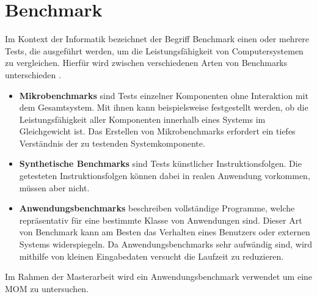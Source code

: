 \section{Benchmark}
Im Kontext der Informatik bezeichnet der Begriff Benchmark einen oder mehrere Tests, die ausgeführt werden, um die Leistungsfähigkeit von Computersystemen zu vergleichen. Hierfür wird zwischen verschiedenen Arten von Benchmarks unterschieden \cite{Lilja2004}. 
\begin{itemize}
\item \textbf{Mikrobenchmarks} sind Tests einzelner Komponenten ohne Interaktion mit dem Gesamtsystem. Mit ihnen kann beispielsweise festgestellt werden, ob die Leistungsfähigkeit aller Komponenten innerhalb eines Systems im Gleichgewicht ist. Das Erstellen von Mikrobenchmarks erfordert ein tiefes Verständnis der zu testenden Systemkomponente.

\item \textbf{Synthetische Benchmarks} sind Tests künstlicher Instruktionsfolgen. Die getesteten Instruktionsfolgen können dabei in realen Anwendung vorkommen, müssen aber nicht.

\item \textbf{Anwendungsbenchmarks} beschreiben vollständige Programme, welche repräsentativ für eine bestimmte Klasse von Anwendungen sind. Dieser Art von Benchmark kann am Besten das Verhalten eines Benutzers oder externen Systems widerspiegeln. Da Anwendungsbenchmarks sehr aufwändig sind, wird mithilfe von kleinen Eingabedaten versucht die Laufzeit zu reduzieren.
\end{itemize}
Im Rahmen der Masterarbeit wird ein Anwendungsbenchmark verwendet um eine MOM zu untersuchen.




